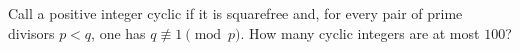 Call a positive integer cyclic if it is squarefree and, for every pair of prime divisors $p<q$, one has $q\not\equiv1\pmod p$. How many cyclic integers are at most $100$?
